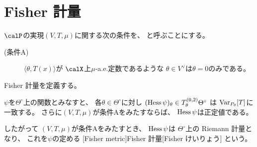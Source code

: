 \documentclass[report]{jlreq}
\begin{document}
\section{Fisher 計量}

\begin{definition}[条件A]
    $\calP$の実現$(V, T, \mu)$に関する次の条件を、
    と呼ぶことにする。
    \begin{description}
        \item[(条件A)] $\langle \theta, T(x) \rangle$が
            $\calX$上$\mu$-a.e.定数であるような
            $\theta \in V^\vee$は$\theta = 0$のみである。
    \end{description}
\end{definition}

Fisher 計量を定義する。

\begin{propdef}[Fisher 計量]
    $\psi$を$\Theta^\circ$上の\smooth 関数とみなすと、
    各$\theta \in \Theta^\circ$に対し
    $(\operatorname{Hess} \psi)_\theta
        \in T^{(0, 2)}_\theta \Theta^\circ$
    は
    $\operatorname{Var}_{P_\theta}[T]$に一致する。
    さらに$(V, T, \mu)$が条件Aをみたすならば、
    $\operatorname{Hess} \psi$は正定値である。

    したがって
    $(V, T, \mu)$が条件Aをみたすとき、
    $\operatorname{Hess}\psi$は
    $\Theta^\circ$上の Riemann 計量となり、
    これを$\psi$の定める
    [Fisher metric]{Fisher 計量}[Fisher けいりょう]
    という。
\end{propdef}
\end{document}
